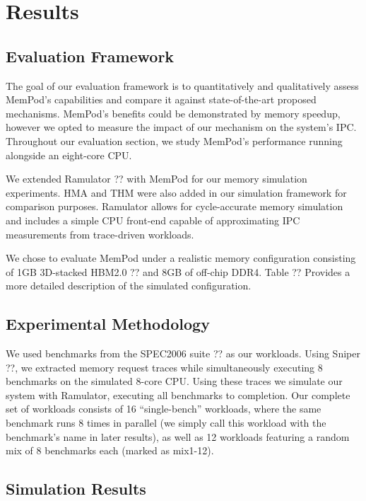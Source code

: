 \section{Results}
\label{sec:Results}

\subsection{Evaluation Framework}
\label{sub:Evaluation}

The goal of our evaluation framework is to quantitatively and qualitatively assess MemPod's capabilities and compare it against state-of-the-art proposed mechanisms. MemPod's benefits could be demonstrated by memory speedup, however we opted to measure the impact of our mechanism on the system's IPC. Throughout our evaluation section, we study MemPod's performance running alongside an eight-core CPU.

We extended Ramulator ?? with MemPod for our memory simulation experiments. HMA and THM were also added in our simulation framework for comparison purposes. Ramulator allows for cycle-accurate memory simulation and includes a simple CPU front-end capable of approximating IPC measurements from trace-driven workloads. 

We chose to evaluate MemPod under a realistic memory configuration consisting of 1GB 3D-stacked HBM2.0 ?? and 8GB of off-chip DDR4. Table ?? Provides a more detailed description of the simulated configuration.


\subsection{Experimental Methodology}
\label{sub:Experimental}

We used benchmarks from the SPEC2006 suite ?? as our workloads. Using Sniper ??, we extracted memory request traces while simultaneously executing 8 benchmarks on the simulated 8-core CPU. Using these traces we simulate our system with Ramulator, executing all benchmarks to completion. Our complete set of workloads consists of 16 ``single-bench'' workloads, where the same benchmark runs 8 times in parallel (we simply call this workload with the benchmark's name in later results), as well as 12 workloads featuring a random mix of 8 benchmarks each (marked as mix1-12).

\subsection{Simulation Results}
\label{sub:SimResults}

